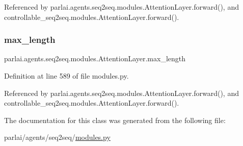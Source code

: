 Referenced by parlai.\+agents.\+seq2seq.\+modules.\+Attention\+Layer.\+forward(), and controllable\+\_\+seq2seq.\+modules.\+Attention\+Layer.\+forward().

\mbox{\label{classparlai_1_1agents_1_1seq2seq_1_1modules_1_1AttentionLayer_ac886c3ee00cb9163fed352af8aa53e0c}} 
\subsubsection{\texorpdfstring{max\+\_\+length}{max\_length}}
{\footnotesize\ttfamily parlai.\+agents.\+seq2seq.\+modules.\+Attention\+Layer.\+max\+\_\+length}



Definition at line 589 of file modules.\+py.



Referenced by parlai.\+agents.\+seq2seq.\+modules.\+Attention\+Layer.\+forward(), and controllable\+\_\+seq2seq.\+modules.\+Attention\+Layer.\+forward().



The documentation for this class was generated from the following file\+:\begin{DoxyCompactItemize}
\item 
parlai/agents/seq2seq/\hyperlink{parlai_2agents_2seq2seq_2modules_8py}{modules.\+py}\end{DoxyCompactItemize}
